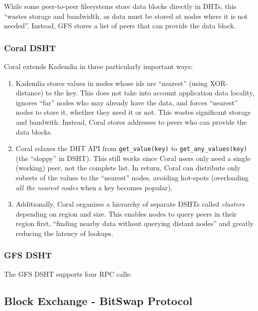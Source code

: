 \documentclass{sig-alternate}
\begin{document}
While some peer-to-peer filesystems store data blocks directly in DHTs,
this ``wastes storage and bandwidth, as data must be stored at nodes where it
is not needed''. Instead, GFS stores a list of peers that can provide the data block.

\subsubsection{Coral DSHT}

Coral extends Kademlia in three particularly important ways:

\begin{enumerate}

  \item Kademlia stores values in nodes whose ids are ``nearest'' (using
        XOR-distance) to the key. This does not take into account application
        data locality, ignores ``far'' nodes who may already have the data, and
        forces ``nearest'' nodes to store it, whether they need it or not.
        This wastes significant storage and bandwith. Instead, Coral stores
        addresses to peers who can provide the data blocks.

  \item Coral relaxes the DHT API from \texttt{get\_value(key)} to
        \texttt{get\_any\_values(key)} (the ``sloppy'' in DSHT).
        This still works since Coral users only need a single (working) peer,
        not the complete list. In return, Coral can distribute only subsets of
        the values to the ``nearest'' nodes, avoiding hot-spots (overloading
        \textit{all the nearest nodes} when a key becomes popular).

  \item Additionally, Coral organizes a hierarchy of separate DSHTs called
        \textit{clusters} depending on region and size. This enables nodes to
        query peers in their region first, ``finding nearby data without
        querying distant nodes'' and greatly reducing the latency of
        lookups.

\end{enumerate}


\subsubsection{GFS DSHT}

The GFS DSHT supports four RPC calls:



\subsection{Block Exchange - BitSwap Protocol}
\end{document}
